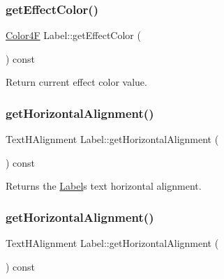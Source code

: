 \subsubsection{\texorpdfstring{get\+Effect\+Color()}{getEffectColor()}\hspace{0.1cm}{\footnotesize\ttfamily [2/2]}}
{\footnotesize\ttfamily \hyperlink{structColor4F}{Color4F} Label\+::get\+Effect\+Color (\begin{DoxyParamCaption}{ }\end{DoxyParamCaption}) const\hspace{0.3cm}{\ttfamily [inline]}}

Return current effect color value. \mbox{\label{classLabel_ae7bcc1f4a628d8d3ab354d80b97cf3e1}} 
\subsubsection{\texorpdfstring{get\+Horizontal\+Alignment()}{getHorizontalAlignment()}\hspace{0.1cm}{\footnotesize\ttfamily [1/2]}}
{\footnotesize\ttfamily Text\+H\+Alignment Label\+::get\+Horizontal\+Alignment (\begin{DoxyParamCaption}{ }\end{DoxyParamCaption}) const\hspace{0.3cm}{\ttfamily [inline]}}

Returns the \hyperlink{classLabel}{Label}\textquotesingle{}s text horizontal alignment. \mbox{\label{classLabel_ae7bcc1f4a628d8d3ab354d80b97cf3e1}} 
\subsubsection{\texorpdfstring{get\+Horizontal\+Alignment()}{getHorizontalAlignment()}\hspace{0.1cm}{\footnotesize\ttfamily [2/2]}}
{\footnotesize\ttfamily Text\+H\+Alignment Label\+::get\+Horizontal\+Alignment (\begin{DoxyParamCaption}{ }\end{DoxyParamCaption}) const\hspace{0.3cm}{\ttfamily [inline]}}

